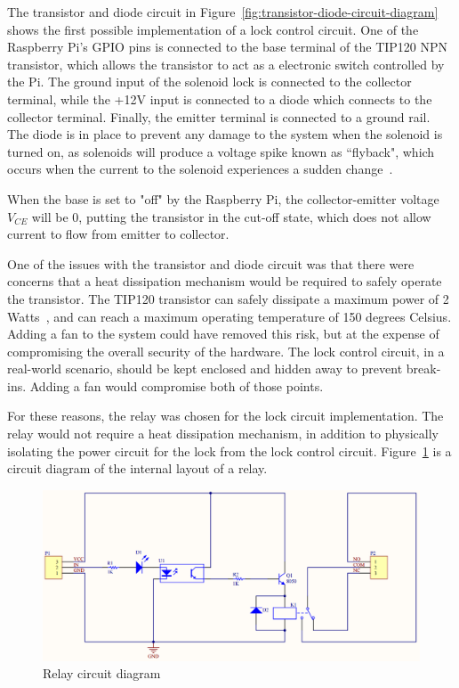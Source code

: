 \documentclass[12pt]{report}
\begin{document}
The transistor and diode circuit in Figure~\ref{fig:transistor-diode-circuit-diagram} shows the first possible 
implementation of a lock control circuit. One of the Raspberry Pi's GPIO pins is connected to the base terminal of the 
TIP120 NPN transistor, which allows the transistor to act as a electronic switch controlled by the Pi. The ground 
input of the solenoid lock is connected to the collector terminal, while the +12V input is connected to a diode which 
connects to the collector terminal. Finally, the emitter terminal is connected to a ground rail. The diode is in place 
to prevent any damage to the system when the solenoid is turned on, as solenoids will produce a voltage spike known as 
``flyback", which occurs when the current to the solenoid experiences a sudden change~\autocite{KICKBACK}.

When the base is set to "off" by the Raspberry Pi, the collector-emitter voltage $V_{CE}$ will be 0, putting the 
transistor in the cut-off state, which does not allow current to flow from emitter to collector.

One of the issues with the transistor and diode circuit was that there were concerns that a heat dissipation mechanism 
would be required to safely operate the transistor. The TIP120 transistor can safely dissipate a maximum power of 2 
Watts~\autocite{TIP120}, and can reach a maximum operating temperature of 150 degrees Celsius. Adding a fan to the 
system could have removed this risk, but at the expense of compromising the overall security of the hardware. The lock 
control circuit, in a real-world scenario, should be kept enclosed and hidden away to prevent break-ins. Adding a fan 
would compromise both of those points.

For these reasons, the relay was chosen for the lock circuit implementation. The relay would not require a heat 
dissipation mechanism, in addition to physically isolating the power circuit for the lock from the lock control 
circuit. Figure~\ref{fig:relay-circuit-diagram} is a circuit diagram of the internal layout of a relay.

\begin{figure}
    \includegraphics[width=\textwidth]{Diagrams/Hardware-Diagrams/relay_circuit}
    \caption[Relay circuit diagram]{Relay circuit diagram~\autocite{RELAYCIRCUIT}}
    \label{fig:relay-circuit-diagram}
\end{figure}
\end{document}
